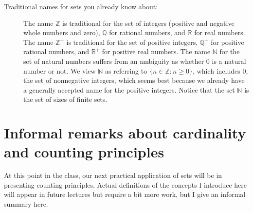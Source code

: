 \documentclass[12pt]{article}
\begin{document}
\begin{description}
\item[Traditional names for sets you already know about:]  The name $\mathbb Z$ is traditional for the set of integers (positive and negative whole numbers and zero), $\mathbb Q$ for rational numbers, and $\mathbb R$ for real numbers.  The name $\mathbb Z^+$ is traditional for the set of positive integers, $\mathbb Q^+$ for positive  rational numbers, and $\mathbb R^+$ for positive real numbers.   The name $\mathbb N$ for the set of natural numbers suffers from an ambiguity as whether 0 is a natural number or not.  We view $\mathbb N$ as referring to $\{n \in \mathbb Z:n \geq 0\}$, which includes 0, the set of nonnegative integers, which seems best because we already have a generally accepted name for the positive integers.  Notice that the set $\mathbb N$ is the set of sizes of finite sets.

\end{description}

\newpage

\section{Informal remarks about cardinality and counting principles}

At this point in the class, our next practical application of sets will be in presenting counting principles.  Actual definitions of the concepts I introduce here will appear in future lectures but require a bit more work, but I give an informal summary here.
\end{document}
